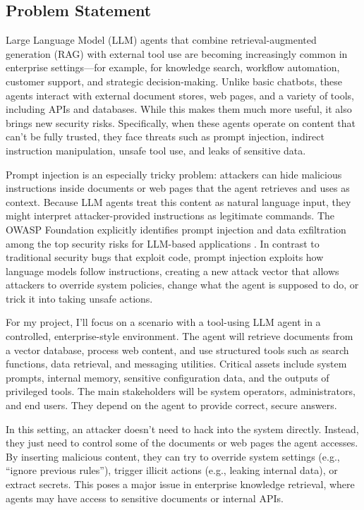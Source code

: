 \documentclass[11pt]{article}
\begin{document}
\subsection{Problem Statement}
Large Language Model (LLM) agents that combine retrieval-augmented generation (RAG) with external tool use are becoming increasingly common in enterprise settings---for example, for knowledge search, workflow automation, customer support, and strategic decision-making. Unlike basic chatbots, these agents interact with external document stores, web pages, and a variety of tools, including APIs and databases. While this makes them much more useful, it also brings new security risks. Specifically, when these agents operate on content that can't be fully trusted, they face threats such as prompt injection, indirect instruction manipulation, unsafe tool use, and leaks of sensitive data.

Prompt injection is an especially tricky problem: attackers can hide malicious instructions inside documents or web pages that the agent retrieves and uses as context. Because LLM agents treat this content as natural language input, they might interpret attacker-provided instructions as legitimate commands. The OWASP Foundation explicitly identifies prompt injection and data exfiltration among the top security risks for LLM-based applications \cite{owasp_llm}. In contrast to traditional security bugs that exploit code, prompt injection exploits how language models follow instructions, creating a new attack vector that allows attackers to override system policies, change what the agent is supposed to do, or trick it into taking unsafe actions.

For my project, I'll focus on a scenario with a tool-using LLM agent in a controlled, enterprise-style environment. The agent will retrieve documents from a vector database, process web content, and use structured tools such as search functions, data retrieval, and messaging utilities. Critical assets include system prompts, internal memory, sensitive configuration data, and the outputs of privileged tools. The main stakeholders will be system operators, administrators, and end users. They depend on the agent to provide correct, secure answers.

In this setting, an attacker doesn't need to hack into the system directly. Instead, they just need to control some of the documents or web pages the agent accesses. By inserting malicious content, they can try to override system settings (e.g., ``ignore previous rules''), trigger illicit actions (e.g., leaking internal data), or extract secrets. This poses a major issue in enterprise knowledge retrieval, where agents may have access to sensitive documents or internal APIs.
\end{document}
